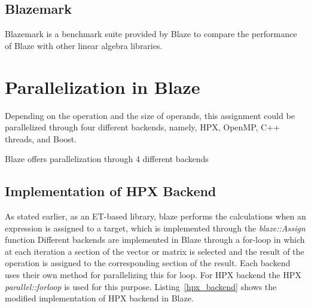 \subsection{Blazemark}
Blazemark is a benchmark suite provided by Blaze to compare the performance of Blaze with other linear algebra libraries.

\vspace{\baselineskip}	
\section{Parallelization in Blaze}
Depending on the operation and the size of operands, this assignment could be parallelized through four different backends, namely, HPX, OpenMP\cite{dagum1998openmp}, C++ threads, and Boost\cite{Boost}. 

Blaze offers parallelization through 4 different backends
\vspace{\baselineskip}	
\subsection{Implementation of HPX Backend}
As stated earlier, as an ET-based library, blaze performs the calculations when an expression is assigned to a target, which is implemented through the \textit{blaze::Assign} function
Different backends are implemented in Blaze through a for-loop in which at each iteration a section of the vector or matrix is selected and the result of the operation is assigned to the corresponding section of the result. 
Each backend uses their own method for parallelizing this for loop. For HPX backend the HPX \textit{parallel::for\textunderscore loop} is used for this purpose. 
Listing~\ref{hpx_backend} shows the modified implementation of HPX backend in Blaze.

